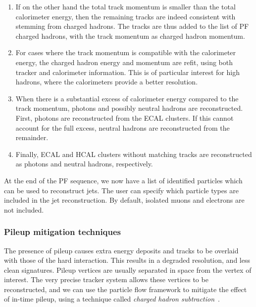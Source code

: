 \begin{enumerate}
  \item If on the other hand the total track momentum is smaller than the total calorimeter energy,
then the remaining tracks are indeed consistent with stemming from charged hadrons. The tracks are
thus added to the list of PF charged hadrons, with the track momentum as charged hadron momentum.

  \item For cases where the track momentum is compatible with the calorimeter energy, the charged
hadron energy and momentum are refit, using both tracker and calorimeter information. This is of
particular interest for high \pt hadrons, where the calorimeters provide a better resolution. 
 
  \item When there is a substantial excess of calorimeter energy compared to the track momentum,
photons and possibly neutral hadrons are reconstructed. First, photons are reconstructed from the
ECAL clusters. If this cannot account for the full excess, neutral hadrons are reconstructed from
the remainder.  
 
  \item Finally, ECAL and HCAL clusters without matching tracks are reconstructed as photons and
neutral hadrons, respectively. 
\end{enumerate}

At the end of the PF sequence, we now have a list of identified particles which can be used to
reconstruct jets. The user can specify which particle types are included in the jet reconstruction. 
By default, isolated muons and electrons are not included.  


\subsubsection{Pileup mitigation techniques}

The presence of pileup causes extra energy deposits and tracks to be overlaid with those of the
hard interaction. This results in a degraded resolution, and less clean signatures.
Pileup vertices are usually separated in space from the vertex of interest. The very precise
tracker system allows these vertices to be reconstructed, and we can use the particle flow
framework to mitigate the effect of in-time pileup, using a technique called \textit{charged
hadron subtraction}~\cite{CMS-PAS-JME-14-001}. 

